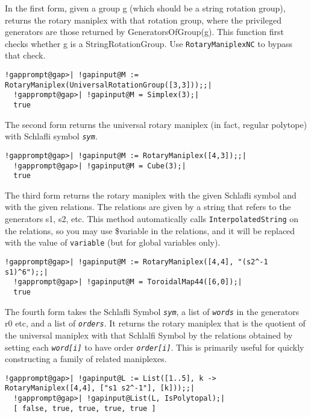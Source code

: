 \documentclass[a4paper,11pt]{report}
\begin{document}
{{{ In the first form, given a group g (which should be a string rotation group),
returns the rotary maniplex with that rotation group, where the privileged
generators are those returned by GeneratorsOfGroup(g). This function first
checks whether g is a StringRotationGroup. Use \texttt{RotaryManiplexNC} to bypass that check. 
\begin{Verbatim}[commandchars=!@|,fontsize=\small,frame=single,label=Example]
  !gapprompt@gap>| !gapinput@M := RotaryManiplex(UniversalRotationGroup([3,3]));;|
  !gapprompt@gap>| !gapinput@M = Simplex(3);|
  true
\end{Verbatim}
 

 The second form returns the universal rotary maniplex (in fact, regular
polytope) with Schlafli symbol \mbox{\texttt{\mdseries\slshape sym}}. 
\begin{Verbatim}[commandchars=!@|,fontsize=\small,frame=single,label=Example]
  !gapprompt@gap>| !gapinput@M := RotaryManiplex([4,3]);;|
  !gapprompt@gap>| !gapinput@M = Cube(3);|
  true
\end{Verbatim}
 

 The third form returns the rotary maniplex with the given Schlafli symbol and
with the given relations. The relations are given by a string that refers to
the generators s1, s2, etc. This method automatically calls \texttt{InterpolatedString} on the relations, so you may use \$variable in the relations, and it will be
replaced with the value of \texttt{variable} (but for global variables only). 
\begin{Verbatim}[commandchars=!@|,fontsize=\small,frame=single,label=Example]
  !gapprompt@gap>| !gapinput@M := RotaryManiplex([4,4], "(s2^-1 s1)^6");;|
  !gapprompt@gap>| !gapinput@M = ToroidalMap44([6,0]);|
  true
\end{Verbatim}
 

 The fourth form takes the Schlafli Symbol \mbox{\texttt{\mdseries\slshape sym}}, a list of \mbox{\texttt{\mdseries\slshape words}} in the generators r0 etc, and a list of \mbox{\texttt{\mdseries\slshape orders}}. It returns the rotary maniplex that is the quotient of the universal
maniplex with that Schlalfi Symbol by the relations obtained by setting each \mbox{\texttt{\mdseries\slshape word[i]}} to have order \mbox{\texttt{\mdseries\slshape order[i]}}. This is primarily useful for quickly constructing a family of related
maniplexes. }

 
\begin{Verbatim}[commandchars=!@|,fontsize=\small,frame=single,label=Example]
  !gapprompt@gap>| !gapinput@L := List([1..5], k -> RotaryManiplex([4,4], ["s1 s2^-1"], [k]));;|
  !gapprompt@gap>| !gapinput@List(L, IsPolytopal);|
  [ false, true, true, true, true ]
\end{Verbatim}
 

}}
\end{document}
